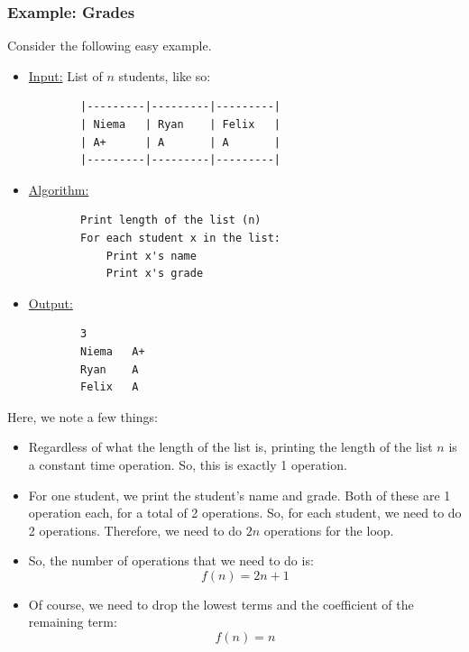 \documentclass[letterpaper]{article}
\begin{document}
\subsubsection{Example: Grades}
Consider the following easy example. 
\begin{itemize}
    \item \underline{Input:} List of $n$ students, like so: 
    \begin{verbatim}
        |---------|---------|---------|
        | Niema   | Ryan    | Felix   |
        | A+      | A       | A       |
        |---------|---------|---------|
    \end{verbatim}
    \item \underline{Algorithm:}
    \begin{verbatim}
        Print length of the list (n)
        For each student x in the list: 
            Print x's name 
            Print x's grade 
    \end{verbatim}
    \item \underline{Output:}
    \begin{verbatim}
        3 
        Niema   A+
        Ryan    A
        Felix   A
    \end{verbatim}
\end{itemize}
Here, we note a few things: 
\begin{itemize}
    \item Regardless of what the length of the list is, printing the length of the list $n$ is a constant time operation. So, this is exactly 1 operation. 
    \item For one student, we print the student's name and grade. Both of these are 1 operation each, for a total of 2 operations. So, for each student, we need to do 2 operations. Therefore, we need to do $2n$ operations for the loop. 
    \item So, the number of operations that we need to do is: 
    \[f(n) = 2n + 1\]
    \item Of course, we need to drop the lowest terms and the coefficient of the remaining term: 
    \[\boxed{f(n) = n}\]
\end{itemize}
\end{document}
